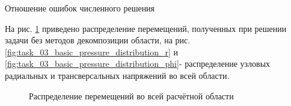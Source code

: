 \documentclass[a4paper]{article}
\begin{document}
\begin{table}[h]
\caption{Отношение ошибок численного решения}
\label{table:task_03_basic_errors_rel}
\end{table}

\newpage

На рис. \ref{fig:task_03_basic_displacement_distribution} приведено распределение перемещений, полученных при решении задачи без методов декомпозиции области, на рис. \ref{fig:task_03_basic_pressure_distribution_r} и \ref{fig:task_03_basic_pressure_distribution_phi}- распределение узловых радиальных и трансверсальных напряжений во всей области.

\begin{figure}[h]
\caption{Распределение перемещений во всей расчётной области}
\label{fig:task_03_basic_displacement_distribution}
\end{figure}

\newpage
\end{document}
